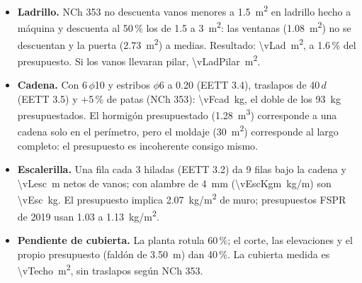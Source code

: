 \documentclass[letterpaper,10pt]{article}
\begin{document}
\begin{itemize}[nosep]
\item \textbf{Ladrillo.} NCh 353 no descuenta vanos menores a \SI{1.5}{m^2} en ladrillo hecho a máquina y descuenta al 50\,\% los de 1.5 a \SI{3}{m^2}: las ventanas (\SI{1.08}{m^2}) no se descuentan y la puerta (\SI{2.73}{m^2}) a medias. Resultado: \SI{\vLad}{m^2}, a 1.6\,\% del presupuesto. Si los vanos llevaran pilar, \SI{\vLadPilar}{m^2}.
\item \textbf{Cadena.} Con 6\,$\phi$10 y estribos $\phi$6 a 0.20 (EETT 3.4), traslapos de 40\,$d$ (EETT 3.5) y +5\,\% de patas (NCh 353): \SI{\vFcad}{kg}, el doble de los \SI{93}{kg} presupuestados. El hormigón presupuestado (\SI{1.28}{m^3}) corresponde a una cadena solo en el perímetro, pero el moldaje (\SI{30}{m^2}) corresponde al largo completo: el presupuesto es incoherente consigo mismo.
\item \textbf{Escalerilla.} Una fila cada 3 hiladas (EETT 3.2) da 9 filas bajo la cadena y \SI{\vLesc}{m} netos de vanos; con alambre de \SI{4}{mm} (\SI{\vEscKgm}{kg/m}) son \SI{\vEsc}{kg}. El presupuesto implica \SI{2.07}{kg/m^2} de muro; presupuestos FSPR de 2019 usan 1.03 a \SI{1.13}{kg/m^2}.
\item \textbf{Pendiente de cubierta.} La planta rotula 60\,\%; el corte, las elevaciones y el propio presupuesto (faldón de \SI{3.50}{m}) dan 40\,\%. La cubierta medida es \SI{\vTecho}{m^2}, sin traslapos según NCh 353.
\end{itemize}

\Needspace{382pt}%
\end{document}

